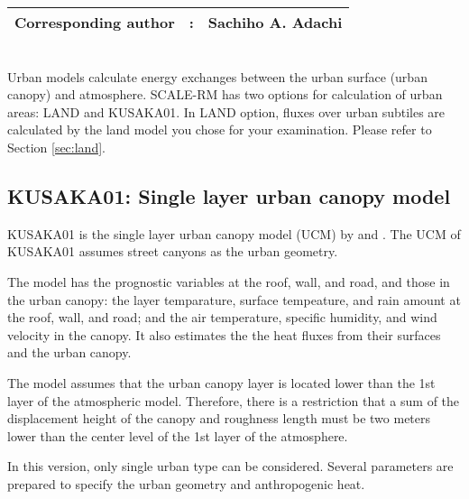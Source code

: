 {\bf \Large
\begin{tabular}{ccc}
\hline
  Corresponding author & : & Sachiho A. Adachi\\
\hline
\end{tabular}
}
\\


Urban models calculate energy exchanges between the urban surface (urban canopy) and atmosphere.
SCALE-RM has two options for calculation of urban areas: LAND and KUSAKA01.
In LAND option, fluxes over urban subtiles are calculated by the land model you chose for your examination.
Please refer to Section \ref{sec:land}.

\subsection{KUSAKA01: Single layer urban canopy model}

KUSAKA01 is the single layer urban canopy model (UCM) by \citet{kusaka_2001} and \citet{kusaka_2004}.
The UCM of KUSAKA01 assumes street canyons as the urban geometry.

The model has the prognostic variables at the roof, wall, and road, and those in the urban canopy:
the layer temparature, surface tempeature, and rain amount at the roof, wall, and road; and the air temperature, specific humidity, and wind velocity in the canopy.
It also estimates the the heat fluxes from their surfaces and the urban canopy.

The model assumes that the urban canopy layer is located lower than the 1st layer of the atmospheric model.
Therefore, there is a restriction that a sum of the displacement height of the canopy and roughness length must be two meters lower than the center level of the 1st layer of the atmosphere.

In this version, only single urban type can be considered.
Several parameters are prepared to specify the urban geometry and anthropogenic heat. 
